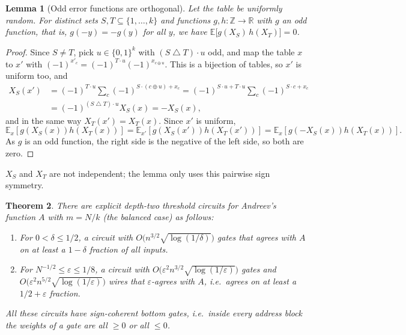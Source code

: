 \documentclass[11pt,letterpaper]{article}
\newtheorem{theorem}{Theorem}
\newtheorem{lemma}[theorem]{Lemma}
\theoremstyle{remark}
\newcommand{\bits}{\{0,1\}}
\begin{document}
\begin{lemma}[Odd error functions are orthogonal]\label{lem:odd}
Let the table be uniformly random. For distinct sets $S,T\subseteq\{1,\dots,k\}$ and functions
$g,h:\mathbb Z\to\mathbb R$ with $g$ an odd function, that is, $g(-y)=-g(y)$ for all $y$, we have
$\mathbb E\bigl[g(X_S)\,h(X_T)\bigr]=0$.
\end{lemma}
\begin{proof}
Since $S\ne T$, pick $u\in\bits^k$ with $(S\mathbin\triangle T)\cdot u$ odd,
and map the table $x$ to $x'$ with $(-1)^{x'_c}=(-1)^{T\cdot u}(-1)^{x_{c\oplus u}}$.
This is a bijection of tables, so $x'$ is uniform too, and
\begin{align*}
X_S(x')
 &=(-1)^{T\cdot u}\sum_{c}(-1)^{S\cdot(c\oplus u)+x_c}
  =(-1)^{S\cdot u+T\cdot u}\sum_{c}(-1)^{S\cdot c+x_c}\\
 &=(-1)^{(S\mathbin\triangle T)\cdot u}X_S(x)=-X_S(x),
\end{align*}
and in the same way $X_T(x')=X_T(x)$. Since $x'$ is uniform,
\[
\mathbb E_x[g(X_S(x))h(X_T(x))]=\mathbb E_{x'}[g(X_S(x'))h(X_T(x'))]
=\mathbb E_x[g(-X_S(x))h(X_T(x))].
\]
As $g$ is an odd function, the right side is the negative of the left side, so both are zero.
\end{proof}
$X_S$ and $X_T$ are not independent; the lemma only uses this
pairwise sign symmetry.

\begin{theorem}\label{thm:avgupper}
There are explicit depth-two threshold circuits for Andreev's function $A$
with $m=N/k$ (the balanced case) as follows:
\begin{enumerate}
\item For $0<\delta\le1/2$, a circuit with $O\bigl(n^{3/2}\sqrt{\log(1/\delta)}\bigr)$
      gates that agrees with $A$ on at least a $1-\delta$ fraction of all inputs.
\item For $N^{-1/2}\le\varepsilon\le1/8$, a circuit with
      $O\bigl(\varepsilon^2n^{3/2}\sqrt{\log(1/\varepsilon)}\bigr)$ gates and
      $O\bigl(\varepsilon^2n^{5/2}\sqrt{\log(1/\varepsilon)}\bigr)$ wires that
      $\varepsilon$-agrees with $A$, i.e.\ agrees on at least a $1/2+\varepsilon$ fraction.
\end{enumerate}
All these circuits have sign-coherent bottom gates, i.e.\
inside every address block the weights of a gate are all $\ge0$ or all
$\le0$.
\end{theorem}
\end{document}
